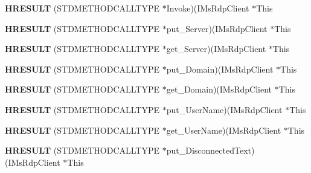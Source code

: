\begin{DoxyCompactItemize}
\item 
\mbox{\label{struct_i_ms_rdp_client_vtbl_ad1cfd3f6754e78d75fb08491a81c8669}} 
{\bfseries H\+R\+E\+S\+U\+LT} (S\+T\+D\+M\+E\+T\+H\+O\+D\+C\+A\+L\+L\+T\+Y\+PE $\ast$Invoke)(I\+Ms\+Rdp\+Client $\ast$This
\item 
\mbox{\label{struct_i_ms_rdp_client_vtbl_aa0f1b097eefe63d8d8b8bc1952861e7d}} 
{\bfseries H\+R\+E\+S\+U\+LT} (S\+T\+D\+M\+E\+T\+H\+O\+D\+C\+A\+L\+L\+T\+Y\+PE $\ast$put\+\_\+\+Server)(I\+Ms\+Rdp\+Client $\ast$This
\item 
\mbox{\label{struct_i_ms_rdp_client_vtbl_ae2d7bc57ec9bf40fe2e48522dc577d72}} 
{\bfseries H\+R\+E\+S\+U\+LT} (S\+T\+D\+M\+E\+T\+H\+O\+D\+C\+A\+L\+L\+T\+Y\+PE $\ast$get\+\_\+\+Server)(I\+Ms\+Rdp\+Client $\ast$This
\item 
\mbox{\label{struct_i_ms_rdp_client_vtbl_a9154b0c99e8f4723b685190d6ad2709e}} 
{\bfseries H\+R\+E\+S\+U\+LT} (S\+T\+D\+M\+E\+T\+H\+O\+D\+C\+A\+L\+L\+T\+Y\+PE $\ast$put\+\_\+\+Domain)(I\+Ms\+Rdp\+Client $\ast$This
\item 
\mbox{\label{struct_i_ms_rdp_client_vtbl_ab1668b9c2be1888fce2e95325ba4adc1}} 
{\bfseries H\+R\+E\+S\+U\+LT} (S\+T\+D\+M\+E\+T\+H\+O\+D\+C\+A\+L\+L\+T\+Y\+PE $\ast$get\+\_\+\+Domain)(I\+Ms\+Rdp\+Client $\ast$This
\item 
\mbox{\label{struct_i_ms_rdp_client_vtbl_adc42e54dd4a5dfee07c4097a96c3e242}} 
{\bfseries H\+R\+E\+S\+U\+LT} (S\+T\+D\+M\+E\+T\+H\+O\+D\+C\+A\+L\+L\+T\+Y\+PE $\ast$put\+\_\+\+User\+Name)(I\+Ms\+Rdp\+Client $\ast$This
\item 
\mbox{\label{struct_i_ms_rdp_client_vtbl_a7cf0175ca3e9eb2e4e72c47b61d15d55}} 
{\bfseries H\+R\+E\+S\+U\+LT} (S\+T\+D\+M\+E\+T\+H\+O\+D\+C\+A\+L\+L\+T\+Y\+PE $\ast$get\+\_\+\+User\+Name)(I\+Ms\+Rdp\+Client $\ast$This
\item 
\mbox{\label{struct_i_ms_rdp_client_vtbl_a115318a3f4b90fc5f96fbe02d346ec37}} 
{\bfseries H\+R\+E\+S\+U\+LT} (S\+T\+D\+M\+E\+T\+H\+O\+D\+C\+A\+L\+L\+T\+Y\+PE $\ast$put\+\_\+\+Disconnected\+Text)(I\+Ms\+Rdp\+Client $\ast$This

\end{DoxyCompactItemize}
